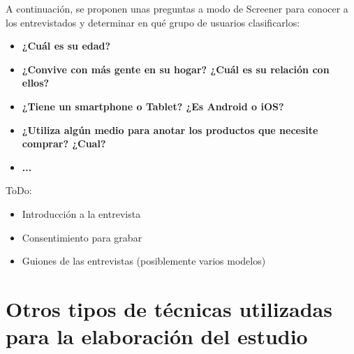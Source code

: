 A continuación, se proponen unas preguntas a modo de Screener para conocer a los entrevistados y determinar en qué grupo de usuarios clasificarlos:

\begin{itemize}
    \item \textbf{¿Cuál es su edad?}
    \item \textbf{¿Convive con más gente en su hogar? ¿Cuál es su relación con ellos?}
    \item \textbf{¿Tiene un smartphone o Tablet? ¿Es Android o iOS?}
    \item \textbf{¿Utiliza algún medio para anotar los productos que necesite comprar? ¿Cual?}
     \item \textbf{...}
\end{itemize}

ToDo:
\begin{itemize}
    \item Introducción a la entrevista
    \item Consentimiento para grabar
    \item Guiones de las entrevistas (posiblemente varios modelos)
\end{itemize}

\section{Otros tipos de técnicas utilizadas para la elaboración del estudio}